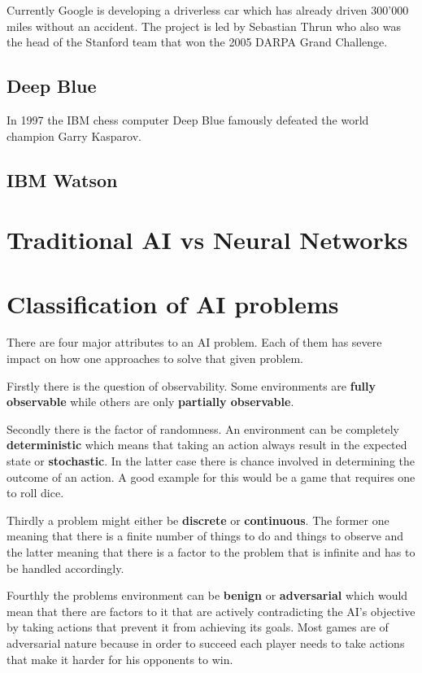 Currently Google is developing a driverless car which has already driven 300'000 miles without an accident. The project is led by Sebastian Thrun who also was the head of the Stanford team that won the 2005 DARPA Grand Challenge.

\subsection{Deep Blue}

In 1997 the IBM chess computer Deep Blue famously defeated the world champion Garry Kasparov. 

\subsection{IBM Watson}

\section{Traditional AI vs Neural Networks}

\section{Classification of AI problems}

There are four major attributes to an AI problem. Each of them has severe impact on how one approaches to solve that given problem.
\begin{description}
\item Firstly there is the question of observability. Some environments are {\bf fully observable} while others are only {\bf partially observable}.
\item Secondly there is the factor of randomness. An environment can be completely {\bf deterministic} which means that taking an action always result in the expected state or {\bf stochastic}. In the latter case there is chance involved in determining the outcome of an action. A good example for this would be a game that requires one to roll dice.
\item Thirdly a problem might either be {\bf discrete} or {\bf continuous}. The former one meaning that there is a finite number of things to do and things to observe and the latter meaning that there is a factor to the problem that is infinite and has to be handled accordingly.
\item Fourthly the problems environment can be {\bf benign} or {\bf adversarial} which would mean that there are factors to it that are actively contradicting the AI's objective by taking actions that prevent it from achieving its goals. Most games are of adversarial nature because in order to succeed each player needs to take actions that make it harder for his opponents to win.
\end{description}

